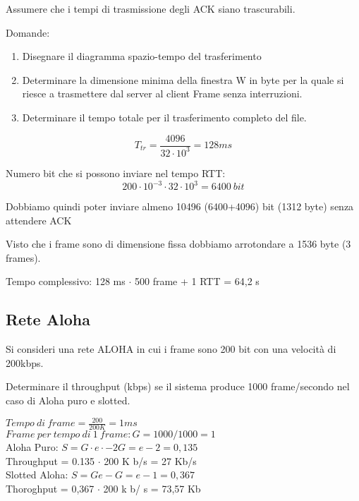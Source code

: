         Assumere che i tempi di trasmissione degli ACK siano trascurabili.
        
        Domande:
        \begin{enumerate}
            \item Disegnare il diagramma spazio-tempo del trasferimento
            \item Determinare la dimensione minima della finestra  W in byte per la quale si riesce a trasmettere dal server al client Frame senza interruzioni. 
            \item Determinare il tempo totale per il trasferimento completo del file.
        \end{enumerate}

        \solution
        \begin{equation*}
            T_{tr} = \frac{4096}{32 \cdot 10^3} = 128 ms
        \end{equation*}

        Numero bit che si possono inviare nel tempo RTT:
        \begin{equation*}
            200 \cdot 10^{-3} \cdot 32 \cdot 10^3 = 6400 ~ bit
        \end{equation*}

        Dobbiamo quindi poter inviare almeno 10496 (6400+4096) bit (1312 byte) senza attendere ACK

        Visto che i frame sono di dimensione fissa  dobbiamo arrotondare a 1536 byte (3 frames).

        Tempo complessivo: 128 ms $\cdot$ 500 frame + 1 RTT = 64,2 s
    
    \subsection{Rete Aloha}
        \problem
        Si consideri una rete ALOHA in cui i frame sono 200 bit con una velocità di 200kbps.

        Determinare il throughput (kbps) se il sistema produce 1000 frame/secondo nel caso di  Aloha puro e slotted.

        \solution
        $Tempo ~ di ~ frame = \frac{200}{200K} = 1ms$\\
        $Frame ~ per ~ tempo ~ di ~ 1 ~ frame: G = 1000 / 1000 = 1$\\
        Aloha Puro:
        $S = G \cdot e \cdot -2G = e-2 = 0,135$\\
        Throughput = 0.135 $\cdot$ 200 K b/s = 27 Kb/s\\
        Slotted Aloha: $S = G e -G =  e -1 = 0,367$\\
        Thoroghput = 0,367 $\cdot$ 200 k b/ s = 73,57 Kb
    
